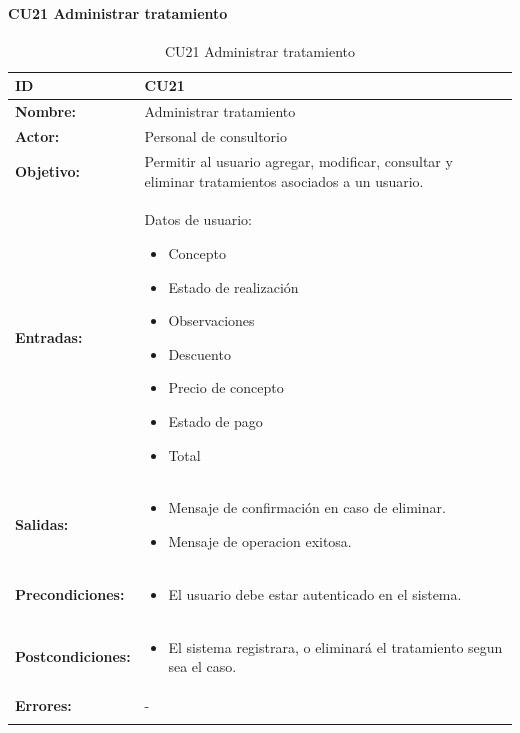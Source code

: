 
\paragraph{CU21 Administrar tratamiento}

\begin{longtable}[H]{|p{}|p{12cm}|}
\hline\textbf{ID}         
& \textbf{CU21}            \\ \hline
\textbf{Nombre:}          
& Administrar tratamiento   \\ \hline
\textbf{Actor:}          
& Personal de consultorio   \\ \hline
\textbf{Objetivo:}       
& Permitir al usuario agregar, modificar, consultar y eliminar tratamientos asociados a un usuario.\\ \hline
\textbf{Entradas:}  & 
Datos de usuario:
\begin{itemize}[nosep]
\item Concepto
\item Estado de realización
\item Observaciones
\item Descuento
\item Precio de concepto
\item Estado de pago
\item Total
\end{itemize}
\\ \hline
\textbf{Salidas:}  & 
\begin{itemize}[nosep]
\item Mensaje de confirmación en caso de eliminar.
\item Mensaje de operacion exitosa.
\end{itemize}
\\ \hline
\textbf{Precondiciones:}  &             
\begin{itemize}[nosep]
\item El usuario debe estar autenticado en el sistema.
\end{itemize}
\\ \hline
\textbf{Postcondiciones:} & 
\begin{itemize}[nosep]
\item El sistema registrara, o eliminará el tratamiento segun sea el caso.
\end{itemize}
\\ \hline
\textbf{Errores:} &  -
\\ \hline
\caption{CU21 Administrar tratamiento}
\label{table:1}
\end{longtable}

